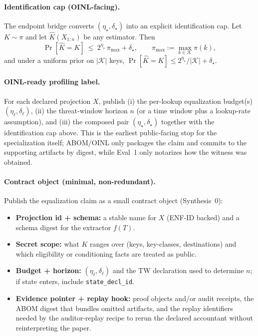 \documentclass[11pt]{article}
\begin{document}
\paragraph{Identification cap (OINL-facing).}
The endpoint bridge converts $(\eta_\star,\delta_\star)$ into an explicit identification cap.\cite{series:endpointbridge}
Let $K\sim\pi$ and let $\widehat K(X_{1:n})$ be any estimator. Then
\[
\Pr[\widehat K = K]\ \le\ 2^{\eta_\star}\,\pi_{\max} + \delta_\star,
\qquad\pi_{\max}:=\max_{k\in\mathcal K}\pi(k),
\]
and under a uniform prior on $|\mathcal K|$ keys, $\Pr[\widehat K = K]\le 2^{\eta_\star}/|\mathcal K| + \delta_\star$.

\paragraph{OINL-ready profiling label.}
For each declared projection $X$, publish (i) the per-lookup equalization budget(s) $(\eta_\ell,\delta_\ell)$, (ii) the threat-window horizon $n$ (or a time window plus a lookup-rate assumption), and (iii) the composed pair $(\eta_\star,\delta_\star)$ together with the identification cap above.
This is the earliest public-facing stop for the specialization itself; ABOM/OINL only packages the claim and commits to the supporting artifacts by digest, while Eval~1 only notarizes how the witness was obtained.\cite{series:abomoinl,series:eval1}

\paragraph{Contract object (minimal, non-redundant).}
Publish the equalization claim as a small contract object (Synthesis~0):\cite{series:contractobjects}
\begin{itemize}[leftmargin=*]
\item \textbf{Projection id + schema:} a stable name for $X$ (ENF-ID backed) and a schema digest for the extractor $f(T)$.\cite{series:traceifaces}
\item \textbf{Secret scope:} what $K$ ranges over (keys, key-classes, destinations) and which eligibility or conditioning facts are treated as public.
\item \textbf{Budget + horizon:} $(\eta_\ell,\delta_\ell)$ and the TW declaration used to determine $n$; if state enters, include \texttt{state\_decl\_id}.\cite{series:threatwindows,series:planstateequiv}
\item \textbf{Evidence pointer + replay hook:} proof objects and/or audit receipts, the ABOM digest that bundles omitted artifacts, and the replay identifiers needed by the auditor-replay recipe to rerun the declared accountant without reinterpreting the paper.\cite{series:abomoinl,series:replayrecipe}
\end{itemize}
\end{document}
